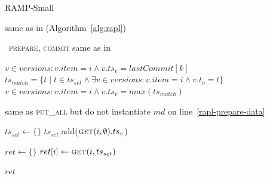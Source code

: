 \begin{algorithm}[t!]
\small
\caption{RAMP-Small}
\label{alg:raps}
\newcommand{\myindent}{\hspace{-1em}}
\begin{algorithmic}[1]
\Statex same as in \rapl (Algorithm~\ref{alg:rapl}) \vspace{.5em}

\
\Statex \textsc{prepare}, \textsc{commit} same as in \rapl\vspace{.5em}

\label{raps-get-server-start}
  \If{$ts_{set} = \emptyset$}
  \State \Return $v \in versions : v.item=i \wedge v.ts_v =
  lastCommit[k]$\label{raps-get-server-nots-end}
  \Else
  \State $ts_{match} = \{t \mid t \in ts_{set} \wedge \exists v \in versions : v.item = i \wedge v.t_v = t\}$\label{raps-get-server-withts-start}
  \State \Return $v \in versions : v.item = i \wedge  v.ts_v =
  max(ts_{match})$\label{raps-get-server-withts-end}
  \EndIf

\EndProcedure\label{raps-get-server-end}
\Statex\hrulefill\vspace{.25em}

\vspace{.25em}

\Statex \hspace{1.5em} same as \rapl \textsc{put\_all} but do not instantiate $md$ on line~\ref{rapl-prepare-data}\label{raps-prepare-data}
\EndProcedure\vspace{.5em}\label{raps-putall-end}

\label{raps-client-getall-start}
\State \hspace{.35em} $ts_{set} \gets \{\}$\label{raps-client-firstround-start}
\ParFor {$i \in I$}
    \State $ts_{set}.$add($\textsc{get}(i, \emptyset).ts_v$)\label{raps-client-firstround-get}
  \EndParFor\vspace{.25em}\label{raps-client-firstround-end}

  \State $ret \gets \{\}$
  \label{raps-client-secondround-start}
    \State $ret[i] \gets \textsc{get}(i, ts_{set})$ \label{raps-client-secondround-get}
  \EndParFor\vspace{.25em}\label{raps-client-secondround-end}

  \State \Return $ret$\label{raps-client-getall-return}
\EndProcedure\label{raps-client-getall-end}


\end{algorithmic}
\end{algorithm}


